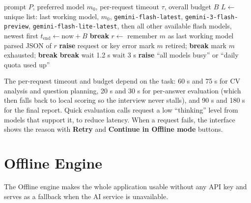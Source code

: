 \documentclass[12pt,a4paper,oneside]{report}
\begin{document}
\begin{algorithm}[H]
\caption{Resilient Gemini request with model fallback}
\label{alg:fallback}
\begin{algorithmic}[1]
\Require prompt $P$, preferred model $m_0$, per-request timeout $\tau$, overall budget $B$
\State $L \gets$ unique list: last working model, $m_0$, \texttt{gemini-flash-latest}, \texttt{gemini-3-flash-preview}, \texttt{gemini-flash-lite-latest}, then all other available flash models, newest first
\State $t_{\text{end}} \gets \text{now} + B$
       \State \textbf{break} \EndIf
      \State $r \gets$ 
       \State remember $m$ as last working model \State \Return parsed JSON of $r$ \EndIf
       \State \textbf{raise} request or key error \EndIf
       \State mark $m$ retired; \textbf{break} \EndIf
       \State mark $m$ exhausted; \textbf{break} \EndIf
       \State \textbf{break}  \EndIf
      \State wait 1.2 s 
    \EndFor
  \EndFor
  \State wait 3 s
\EndFor
\State \textbf{raise} ``all models busy'' or ``daily quota used up'' 
\end{algorithmic}
\end{algorithm}

The per-request timeout and budget depend on the task: 60 s and 75 s for CV analysis and question planning, 20 s and 30 s for per-answer evaluation (which then falls back to local scoring so the interview never stalls), and 90 s and 180 s for the final report. Quick evaluation calls request a low ``thinking'' level from models that support it, to reduce latency. When a request fails, the interface shows the reason with \textbf{Retry} and \textbf{Continue in Offline mode} buttons.

\section{Offline Engine}
The Offline engine makes the whole application usable without any API key and serves as a fallback when the AI service is unavailable.
\end{document}
